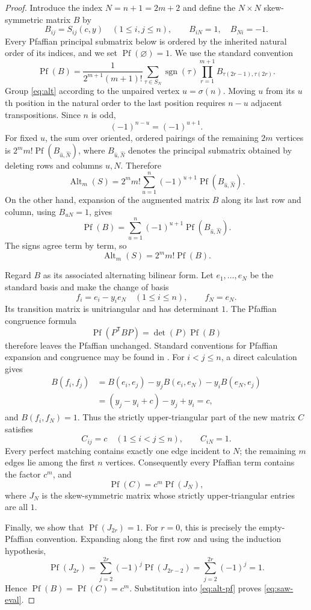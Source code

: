 \documentclass[11pt,a4paper]{article}
\theoremstyle{definition}
\newcommand{\Alt}{\operatorname{Alt}}
\newcommand{\Pf}{\operatorname{Pf}}
\newcommand{\sgn}{\operatorname{sgn}}
\begin{document}
\begin{proof}
Introduce the index $N=n+1=2m+2$ and define the $N\times N$
skew-symmetric matrix $B$ by
\[
 B_{ij}=S_{ij}(c,y)\quad(1\le i,j\le n),\qquad
 B_{iN}=1,\quad B_{Ni}=-1.
\]
Every Pfaffian principal submatrix below is ordered by the inherited
natural order of its indices, and we set $\Pf(\varnothing)=1$. We use the
standard convention
\[
\Pf(B)=\frac1{2^{m+1}(m+1)!}
\sum_{\tau\in S_N}\sgn(\tau)
\prod_{r=1}^{m+1}B_{\tau(2r-1),\tau(2r)}.
\]
Group \eqref{eq:alt} according to the unpaired vertex
$u=\sigma(n)$. Moving $u$ from its $u$th position in the natural order
to the last position requires $n-u$ adjacent transpositions. Since $n$
is odd,
\[
(-1)^{n-u}=(-1)^{u+1}.
\]
For fixed $u$, the sum over oriented, ordered pairings of the remaining
$2m$ vertices is
$2^m m!\Pf(B_{\widehat u,\widehat N})$, where
$B_{\widehat u,\widehat N}$ denotes the principal submatrix obtained by
deleting rows and columns $u,N$. Therefore
\[
\Alt_m(S)=2^m m!\sum_{u=1}^{n}
(-1)^{u+1}\Pf(B_{\widehat u,\widehat N}).
\]
On the other hand, expansion of the augmented matrix $B$ along its last
row and column, using $B_{uN}=1$, gives
\[
\Pf(B)=\sum_{u=1}^{n}(-1)^{u+1}
\Pf(B_{\widehat u,\widehat N}).
\]
The signs agree term by term, so
\begin{equation}\label{eq:alt-pf}
 \Alt_m(S)=2^m m!\Pf(B).
\end{equation}

Regard $B$ as its associated alternating bilinear form. Let
$e_1,\ldots,e_N$ be the standard basis and make the change of basis
\[
 f_i=e_i-y_i e_N\quad(1\le i\le n),\qquad f_N=e_N.
\]
Its transition matrix is unitriangular and has determinant $1$. The
Pfaffian congruence formula
\[
 \Pf(P^{\mathsf T}BP)=\det(P)\Pf(B)
\]
therefore leaves the Pfaffian unchanged. Standard conventions for
Pfaffian expansion and congruence may be found in \cite{Knuth1996}.
For $i<j\le n$, a direct calculation gives
\[
\begin{aligned}
B(f_i,f_j)
&=B(e_i,e_j)-y_jB(e_i,e_N)-y_iB(e_N,e_j)\\
&=(y_j-y_i+c)-y_j+y_i=c,
\end{aligned}
\]
and $B(f_i,f_N)=1$. Thus the strictly upper-triangular part of the new
matrix $C$ satisfies
\[
 C_{ij}=c\quad(1\le i<j\le n),\qquad C_{iN}=1.
\]
Every perfect matching contains exactly one edge incident to $N$; the
remaining $m$ edges lie among the first $n$ vertices. Consequently every
Pfaffian term contains the factor $c^m$, and
\[
 \Pf(C)=c^m\Pf(J_N),
\]
where $J_N$ is the skew-symmetric matrix whose strictly upper-triangular
entries are all $1$.

Finally, we show that $\Pf(J_{2r})=1$. For $r=0$, this is precisely the
empty-Pfaffian convention. Expanding along the first row and using the
induction hypothesis,
\[
 \Pf(J_{2r})
 =\sum_{j=2}^{2r}(-1)^j\Pf(J_{2r-2})
 =\sum_{j=2}^{2r}(-1)^j=1.
\]
Hence $\Pf(B)=\Pf(C)=c^m$. Substitution into \eqref{eq:alt-pf} proves
\eqref{eq:saw-eval}.
\end{proof}
\end{document}
